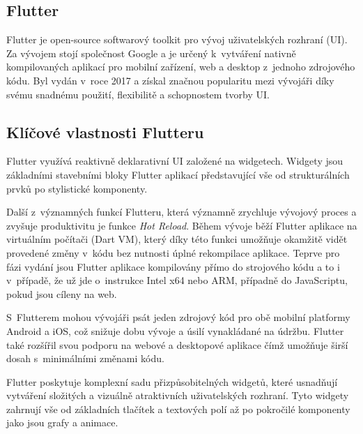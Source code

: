 \subsection{Flutter}
Flutter je open-source softwarový toolkit pro vývoj uživatelských rozhraní (UI). \cite{flutterfaq} Za vývojem stojí společnost Google a je určený k~vytváření nativně kompilovaných 
aplikací pro mobilní zařízení, web a desktop z~jednoho zdrojového kódu. \cite{flutterfaq}
Byl vydán v~roce 2017 a získal značnou popularitu mezi vývojáři díky svému snadnému použití, flexibilitě a schopnostem tvorby UI.

\subsection*{Klíčové vlastnosti Flutteru}

Flutter využívá reaktivně deklarativní UI založené na widgetech. \cite{flutterUI} Widgety jsou základními stavebními 
bloky Flutter aplikací představující vše od strukturálních prvků po stylistické komponenty. \cite{flutterWidgets}

Další z~významných funkcí Flutteru, která významně zrychluje vývojový proces a zvyšuje produktivitu je funkce \textit{Hot Reload}. 
Během vývoje běží Flutter aplikace na virtuálním počítači (Dart VM), který díky této funkci umožňuje okamžitě vidět provedené změny
v~kódu bez nutnosti úplné rekompilace aplikace. \cite{flutterHotReload} Teprve pro fázi vydání jsou Flutter aplikace kompilovány přímo do strojového kódu a to 
i v~případě, že už jde o~instrukce Intel x64 nebo ARM, případně do JavaScriptu, pokud jsou cíleny na web. \cite{flutterArchOverview}


S~Flutterem mohou vývojáři psát jeden zdrojový kód pro obě mobilní platformy Android a iOS, což snižuje dobu vývoje a úsilí 
vynakládané na údržbu. Flutter také rozšířil svou podporu na webové a desktopové aplikace čímž umožňuje širší dosah s~minimálními změnami kódu. \cite{flutter}

Flutter poskytuje komplexní sadu přizpůsobitelných widgetů, které usnadňují vytváření složitých a vizuálně 
atraktivních uživatelských rozhraní. Tyto widgety zahrnují vše od základních tlačítek a textových polí až po 
pokročilé komponenty jako jsou grafy a animace. \cite{flutterWidgets2}

